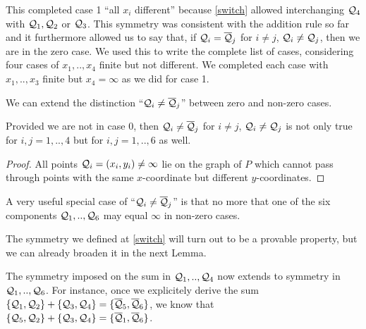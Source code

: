 \documentclass[english,11pt,a4paper]{article}
\begin{document}
This completed case 1 ``all $x_i$ different'' because \eqref{switch} allowed interchanging $\mathcal{Q}_4$ with $\mathcal{Q}_1, \mathcal{Q}_2$ or $\mathcal{Q}_3$. This symmetry was consistent with the addition rule so far and it furthermore allowed us to say that, if $\mathcal{Q}_i = \overline {\mathcal{Q}}_j$ for $i \neq j$, $\mathcal{Q}_i \neq \mathcal{Q}_j$, then we are in the zero case. We used this to write the complete list of cases, considering four cases of $x_1,..,x_4$ finite but not different. We completed each case with $x_1,..,x_3$ finite but $x_4 = \infty$ as we did for case 1.

We can extend the distinction ``$\mathcal{Q}_i \neq \overline {\mathcal{Q}}_j$'' between zero and non-zero cases.

\begin{lemma}\label{atmost1}
  Provided we are not in case 0, then $\mathcal{Q}_i \neq \overline {\mathcal{Q}}_j$ for $i \neq j$, $\mathcal{Q}_i \neq \mathcal{Q}_j$ is not only true for $i,j = 1,..,4$ but for $i,j = 1,..,6$ as well.

  \begin{proof}
    All points $\mathcal{Q}_i = (x_i,y_i) \neq \infty$ lie on the graph of $P$ which cannot pass through points with the same $x$-coordinate but different $y$-coordinates.
  \end{proof}


  A very useful special case of ``$\mathcal{Q}_i \neq \overline {\mathcal{Q}}_j$'' is that no more that one of the six components $\mathcal{Q}_1,.., \mathcal{Q}_6$ may equal $\infty$ in non-zero cases.
\end{lemma}


The symmetry we defined at \eqref{switch} will turn out to be a provable property, but we can already broaden it in the next Lemma.

\begin{lemma}\label{symall}
  The symmetry imposed on the sum in $\mathcal{Q}_1, .., \mathcal{Q}_4$ now extends to symmetry in $\mathcal{Q}_1, .., \mathcal{Q}_6$. For instance, once we explicitely derive the sum $\{\mathcal{Q}_1, \mathcal{Q}_2 \} +\{ \mathcal{Q}_3 , \mathcal{Q}_4 \} = \{\overline {\mathcal{Q}}_5 , \overline {\mathcal{Q}}_6\}$, we know that $\{\mathcal{Q}_5, \mathcal{Q}_2 \} +\{ \mathcal{Q}_3 , \mathcal{Q}_4 \} = \{\overline {\mathcal{Q}}_1 , \overline {\mathcal{Q}}_6\}$.
\end{lemma}
\end{document}
